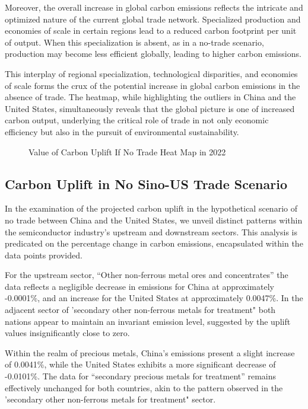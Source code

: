 Moreover, the overall increase in global carbon emissions reflects the intricate and optimized nature of the current global trade network. Specialized production and economies of scale in certain regions lead to a reduced carbon footprint per unit of output. When this specialization is absent, as in a no-trade scenario, production may become less efficient globally, leading to higher carbon emissions.

This interplay of regional specialization, technological disparities, and economies of scale forms the crux of the potential increase in global carbon emissions in the absence of trade. The heatmap, while highlighting the outliers in China and the United States, simultaneously reveals that the global picture is one of increased carbon output, underlying the critical role of trade in not only economic efficiency but also in the pursuit of environmental sustainability.
\ifincludefigures
\begin{figure}
 \centering
 \caption{Value of Carbon Uplift If No Trade Heat Map in 2022}\label{fig:Value of Carbon Uplift If No Trade Heatmap in 2022}
\end{figure}
\fi

\subsection{Carbon Uplift in No Sino-US Trade Scenario}

In the examination of the projected carbon uplift in the hypothetical scenario of no trade between China and the United States, we unveil distinct patterns within the semiconductor industry's upstream and downstream sectors. This analysis is predicated on the percentage change in carbon emissions, encapsulated within the data points provided.

For the upstream sector, ``Other non-ferrous metal ores and concentrates'' the data reflects a negligible decrease in emissions for China at approximately -0.0001\%, and an increase for the United States at approximately 0.0047\%. In the adjacent sector of 'secondary other non-ferrous metals for treatment" both nations appear to maintain an invariant emission level, suggested by the uplift values insignificantly close to zero.

Within the realm of precious metals, China's emissions present a slight increase of 0.0041\%, while the United States exhibits a more significant decrease of -0.0101\%. The data for ``secondary precious metals for treatment'' remains effectively unchanged for both countries, akin to the pattern observed in the 'secondary other non-ferrous metals for treatment" sector.

